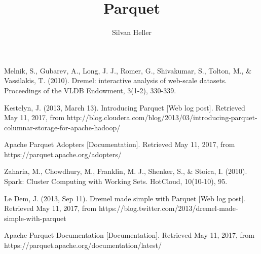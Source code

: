 \title{Parquet}
\author{Silvan Heller}

\maketitle













%
%
\begin{thebibliography}{1}
%

Melnik, S., Gubarev, A., Long, J. J., Romer, G., Shivakumar, S., Tolton, M., \& Vassilakis, T. (2010). Dremel: interactive analysis of web-scale datasets. Proceedings of the VLDB Endowment, 3(1-2), 330-339.

Kestelyn, J. (2013, March 13). Introducing Parquet [Web log post]. Retrieved May 11, 2017, from http://blog.cloudera.com/blog/2013/03/introducing-parquet-columnar-storage-for-apache-hadoop/

Apache Parquet Adopters [Documentation]. Retrieved May 11, 2017, from https://parquet.apache.org/adopters/

Zaharia, M., Chowdhury, M., Franklin, M. J., Shenker, S., \& Stoica, I. (2010). Spark: Cluster Computing with Working Sets. HotCloud, 10(10-10), 95.

Le Dem, J. (2013, Sep 11). Dremel made simple with Parquet [Web log post]. Retrieved May 11, 2017, from https://blog.twitter.com/2013/dremel-made-simple-with-parquet

Apache Parquet Documentation [Documentation]. Retrieved May 11, 2017, from https://parquet.apache.org/documentation/latest/

\end{thebibliography}
